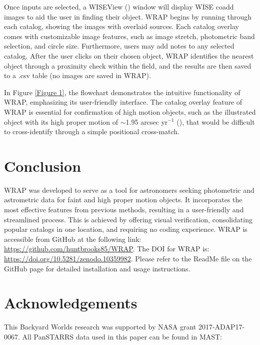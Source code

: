 \documentclass[twocolumn]{aastex631}
\begin{document}
Once inputs are selected, a WISEView (\citealt{Caselden et al. 2018}) window will display WISE coadd images to aid the user in finding their object. WRAP begins by running through each catalog, showing the images with overlaid sources. Each catalog overlay comes with customizable image features, such as image stretch, photometric band selection, and circle size. Furthermore, users may add notes to any selected catalog.  After the user clicks on their chosen object, WRAP identifies the nearest object through a proximity check within the field, and the results are then saved to a .csv table (no images are saved in WRAP).

In Figure \ref{Figure 1}, the flowchart demonstrates the intuitive functionality of WRAP, emphasizing its user-friendly interface. The catalog overlay feature of WRAP is essential for confirmation of high motion objects, such as the illustrated object with its high proper motion of $\sim$1.95 arcsec yr$^{-1}$ (\citealt{Bardalez Gagliuffi et al.(2014)}), that would be difficult to cross-identify through a simple positional cross-match. 

\section{Conclusion} \label{conclusion}
WRAP was developed to serve as a tool for astronomers seeking photometric and astrometric data for faint and high proper motion objects. It incorporates the most effective features from previous methods, resulting in a user-friendly and streamlined process. This is achieved by offering visual verification, consolidating popular catalogs in one location, and requiring no coding experience. WRAP is accessible from GitHub at the following link: \url{https://github.com/huntbrooks85/WRAP}. The DOI for WRAP is: \url{https://doi.org/10.5281/zenodo.10359982}. Please refer to the ReadMe file on the GitHub page for detailed installation and usage instructions. 

\section{Acknowledgements} 


This Backyard Worlds research was supported by NASA grant 2017-ADAP17-0067. All PanSTARRS data used in this paper can be found in MAST: 

\end{document}
